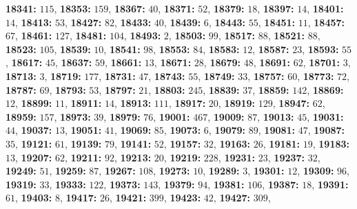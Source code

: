 \textsf{\bfseries 18341:} $115$, \textsf{\bfseries 18353:} $159$, \textsf{\bfseries 18367:} $40$, \textsf{\bfseries 18371:} $52$, \textsf{\bfseries 18379:} $18$, \textsf{\bfseries 18397:} $14$, \textsf{\bfseries 18401:} $14$, \textsf{\bfseries 18413:} $53$, \textsf{\bfseries 18427:} $82$, \textsf{\bfseries 18433:} $40$, \textsf{\bfseries 18439:} $6$, \textsf{\bfseries 18443:} $55$, \textsf{\bfseries 18451:} $11$, \textsf{\bfseries 18457:} $67$, \textsf{\bfseries 18461:} $127$, \textsf{\bfseries 18481:} $104$, \textsf{\bfseries 18493:} $2$, \textsf{\bfseries 18503:} $99$, \textsf{\bfseries 18517:} $88$, \textsf{\bfseries 18521:} $88$, \textsf{\bfseries 18523:} $105$, \textsf{\bfseries 18539:} $10$, \textsf{\bfseries 18541:} $98$, \textsf{\bfseries 18553:} $84$, \textsf{\bfseries 18583:} $12$, \textsf{\bfseries 18587:} $23$, \textsf{\bfseries 18593:} $55$, \textsf{\bfseries 18617:} $45$, \textsf{\bfseries 18637:} $59$, \textsf{\bfseries 18661:} $13$, \textsf{\bfseries 18671:} $28$, \textsf{\bfseries 18679:} $48$, \textsf{\bfseries 18691:} $62$, \textsf{\bfseries 18701:} $3$, \textsf{\bfseries 18713:} $3$, \textsf{\bfseries 18719:} $177$, \textsf{\bfseries 18731:} $47$, \textsf{\bfseries 18743:} $55$, \textsf{\bfseries 18749:} $33$, \textsf{\bfseries 18757:} $60$, \textsf{\bfseries 18773:} $72$, \textsf{\bfseries 18787:} $69$, \textsf{\bfseries 18793:} $53$, \textsf{\bfseries 18797:} $21$, \textsf{\bfseries 18803:} $245$, \textsf{\bfseries 18839:} $37$, \textsf{\bfseries 18859:} $142$, \textsf{\bfseries 18869:} $12$, \textsf{\bfseries 18899:} $11$, \textsf{\bfseries 18911:} $14$, \textsf{\bfseries 18913:} $111$, \textsf{\bfseries 18917:} $20$, \textsf{\bfseries 18919:} $129$, \textsf{\bfseries 18947:} $62$, \textsf{\bfseries 18959:} $157$, \textsf{\bfseries 18973:} $39$, \textsf{\bfseries 18979:} $76$, \textsf{\bfseries 19001:} $467$, \textsf{\bfseries 19009:} $87$, \textsf{\bfseries 19013:} $45$, \textsf{\bfseries 19031:} $44$, \textsf{\bfseries 19037:} $13$, \textsf{\bfseries 19051:} $41$, \textsf{\bfseries 19069:} $85$, \textsf{\bfseries 19073:} $6$, \textsf{\bfseries 19079:} $89$, \textsf{\bfseries 19081:} $47$, \textsf{\bfseries 19087:} $35$, \textsf{\bfseries 19121:} $61$, \textsf{\bfseries 19139:} $79$, \textsf{\bfseries 19141:} $52$, \textsf{\bfseries 19157:} $32$, \textsf{\bfseries 19163:} $26$, \textsf{\bfseries 19181:} $19$, \textsf{\bfseries 19183:} $13$, \textsf{\bfseries 19207:} $62$, \textsf{\bfseries 19211:} $92$, \textsf{\bfseries 19213:} $20$, \textsf{\bfseries 19219:} $228$, \textsf{\bfseries 19231:} $23$, \textsf{\bfseries 19237:} $32$, \textsf{\bfseries 19249:} $51$, \textsf{\bfseries 19259:} $87$, \textsf{\bfseries 19267:} $108$, \textsf{\bfseries 19273:} $10$, \textsf{\bfseries 19289:} $3$, \textsf{\bfseries 19301:} $12$, \textsf{\bfseries 19309:} $96$, \textsf{\bfseries 19319:} $33$, \textsf{\bfseries 19333:} $122$, \textsf{\bfseries 19373:} $143$, \textsf{\bfseries 19379:} $94$, \textsf{\bfseries 19381:} $106$, \textsf{\bfseries 19387:} $18$, \textsf{\bfseries 19391:} $61$, \textsf{\bfseries 19403:} $8$, \textsf{\bfseries 19417:} $26$, \textsf{\bfseries 19421:} $399$, \textsf{\bfseries 19423:} $42$, \textsf{\bfseries 19427:} $309$, 
